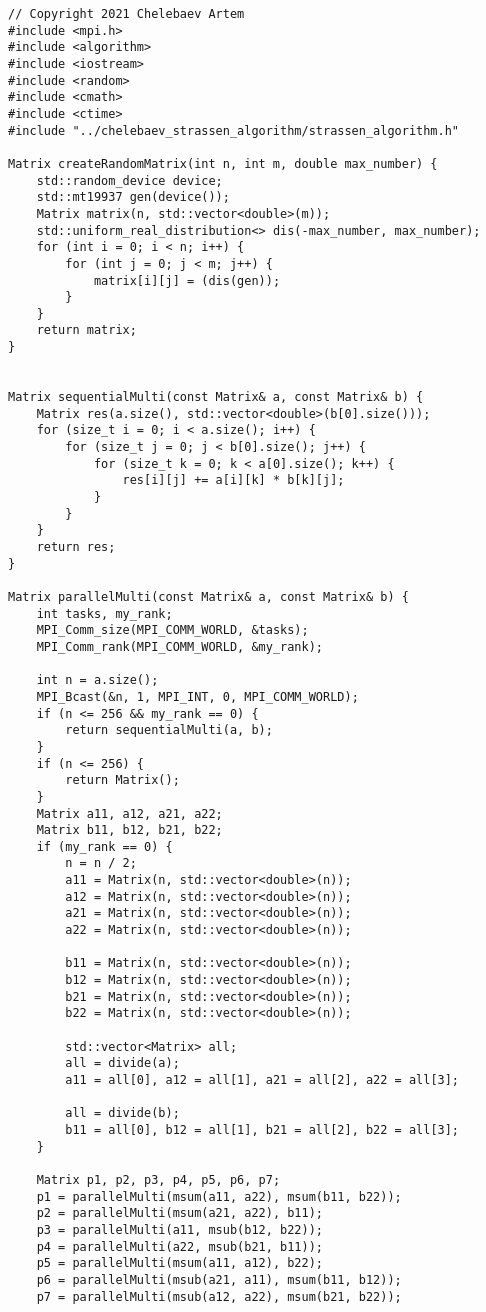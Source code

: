 \documentclass{report}
\begin{document}
\begin{lstlisting}
// Copyright 2021 Chelebaev Artem
#include <mpi.h>
#include <algorithm>
#include <iostream>
#include <random>
#include <cmath>
#include <ctime>
#include "../chelebaev_strassen_algorithm/strassen_algorithm.h"

Matrix createRandomMatrix(int n, int m, double max_number) {
    std::random_device device;
    std::mt19937 gen(device());
    Matrix matrix(n, std::vector<double>(m));
    std::uniform_real_distribution<> dis(-max_number, max_number);
    for (int i = 0; i < n; i++) {
        for (int j = 0; j < m; j++) {
            matrix[i][j] = (dis(gen));
        }
    }
    return matrix;
}


Matrix sequentialMulti(const Matrix& a, const Matrix& b) {
    Matrix res(a.size(), std::vector<double>(b[0].size()));
    for (size_t i = 0; i < a.size(); i++) {
        for (size_t j = 0; j < b[0].size(); j++) {
            for (size_t k = 0; k < a[0].size(); k++) {
                res[i][j] += a[i][k] * b[k][j];
            }
        }
    }
    return res;
}

Matrix parallelMulti(const Matrix& a, const Matrix& b) {
    int tasks, my_rank;
    MPI_Comm_size(MPI_COMM_WORLD, &tasks);
    MPI_Comm_rank(MPI_COMM_WORLD, &my_rank);

    int n = a.size();
    MPI_Bcast(&n, 1, MPI_INT, 0, MPI_COMM_WORLD);
    if (n <= 256 && my_rank == 0) {
        return sequentialMulti(a, b);
    }
    if (n <= 256) {
        return Matrix();
    }
    Matrix a11, a12, a21, a22;
    Matrix b11, b12, b21, b22;
    if (my_rank == 0) {
        n = n / 2;
        a11 = Matrix(n, std::vector<double>(n));
        a12 = Matrix(n, std::vector<double>(n));
        a21 = Matrix(n, std::vector<double>(n));
        a22 = Matrix(n, std::vector<double>(n));

        b11 = Matrix(n, std::vector<double>(n));
        b12 = Matrix(n, std::vector<double>(n));
        b21 = Matrix(n, std::vector<double>(n));
        b22 = Matrix(n, std::vector<double>(n));

        std::vector<Matrix> all;
        all = divide(a);
        a11 = all[0], a12 = all[1], a21 = all[2], a22 = all[3];

        all = divide(b);
        b11 = all[0], b12 = all[1], b21 = all[2], b22 = all[3];
    }

    Matrix p1, p2, p3, p4, p5, p6, p7;
    p1 = parallelMulti(msum(a11, a22), msum(b11, b22));
    p2 = parallelMulti(msum(a21, a22), b11);
    p3 = parallelMulti(a11, msub(b12, b22));
    p4 = parallelMulti(a22, msub(b21, b11));
    p5 = parallelMulti(msum(a11, a12), b22);
    p6 = parallelMulti(msub(a21, a11), msum(b11, b12));
    p7 = parallelMulti(msub(a12, a22), msum(b21, b22));


\end{lstlisting}
\end{document}
